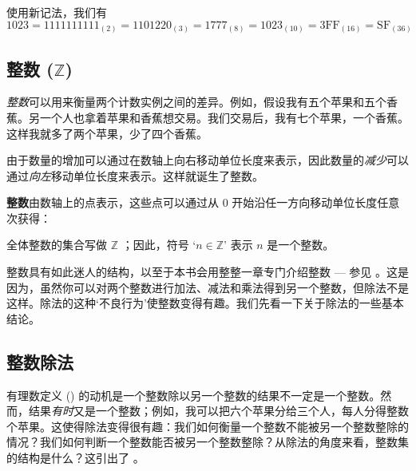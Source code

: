 \begin{example}
使用新记法，我们有
\[ 1023 = 1111111111_{(2)} = 1101220_{(3)} = 1777_{(8)} = 1023_{(10)} = 3\mathrm{FF}_{(16)} = \mathrm{SF}_{(36)} \]
\end{example}

\subsection*{整数 ($\mathbb{Z}$)}

\textit{整数}可以用来衡量两个计数实例之间的差异。例如，假设我有五个苹果和五个香蕉。另一个人也拿着苹果和香蕉想交易。我们交易后，我有七个苹果，一个香蕉。这样我就多了两个苹果，少了四个香蕉。

由于数量的增加可以通过在数轴上向右移动单位长度来表示，因此数量的\textit{减少}可以通过\textit{向左}移动单位长度来表示。这样就诞生了整数。

\begin{definition}
\label{defIntegersInformal}
\textbf{整数}由数轴上的点表示，这些点可以通过从 $0$ 开始沿任一方向移动单位长度任意次获得：
\begin{center}
\end{center}
全体整数的集合写做 $\mathbb{Z}$ ；因此，符号 `$n \in \mathbb{Z}$' 表示 $n$ 是一个整数。
\end{definition}

整数具有如此迷人的结构，以至于本书会用整整一章专门介绍整数 --- 参见 。这是因为，虽然你可以对两个整数进行加法、减法和乘法得到另一个整数，但除法不是这样。除法的这种`不良行为'使整数变得有趣。我们先看一下关于除法的一些基本结论。

\subsection*{整数除法}
\label{pGettingStartedDivision}

有理数定义 () 的动机是一个整数除以另一个整数的结果不一定是一个整数。然而，结果\textit{有时}又是一个整数；例如，我可以把六个苹果分给三个人，每人分得整数个苹果。这使得除法变得很有趣：我们如何衡量一个整数不能被另一个整数整除的情况？我们如何判断一个整数能否被另一个整数整除？从除法的角度来看，整数集的结构是什么？这引出了 。

